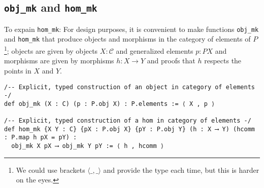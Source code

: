 \documentclass{article}
\newcommand{\CC}{\mathcal{C}}
\newcommand{\<}{\langle}
\renewcommand{\>}{\rangle}
\theoremstyle{definitionstyle}
\theoremstyle{exercisestyle}
\theoremstyle{remarkstyle}
\begin{document}
\subsection{\texttt{obj\_mk} and \texttt{hom\_mk}}
To expain \texttt{hom\_mk}:
For design purposes, it is convenient to make functions \texttt{obj\_mk}
and \texttt{hom\_mk} that produce objects and morphisms in the category
of elements of $P$\footnote{We could use brackets $\<\_,\_\>$
  and provide the type each time, but this is harder on the eyes. };
objects are given by objects $X : \CC$ and generalized elements $p : P X$
and morphisms are given by morphisms $h : X \to Y$ and proofs that
$h$ respects the points in $X$ and $Y$.

\begin{lstlisting}
/-- Explicit, typed construction of an object in category of elements -/
def obj_mk (X : C) (p : P.obj X) : P.elements := ⟨ X , p ⟩

/-- Explicit, typed construction of a hom in category of elements -/
def hom_mk {X Y : C} {pX : P.obj X} {pY : P.obj Y} (h : X ⟶ Y) (hcomm : P.map h pX = pY) :
  obj_mk X pX ⟶ obj_mk Y pY := ⟨ h , hcomm ⟩\end{lstlisting}
\end{document}
